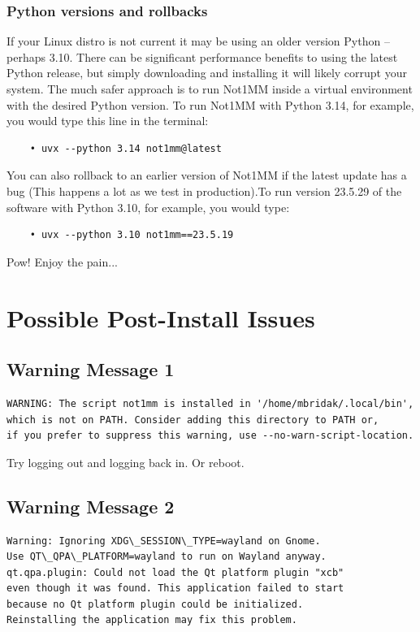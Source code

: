 \documentclass{article}
\begin{document}
\subsubsection{Python versions and rollbacks}
\label{subsec:rollback}
If your Linux distro is not current it may be using an older version Python -- perhaps 3.10. There can be significant performance benefits to using the latest Python release, but simply downloading and installing it will likely corrupt your system. The much safer approach is to run Not1MM inside a virtual environment with the desired Python version. To run Not1MM with Python 3.14, for example, you would type this line in the terminal:

\begin{verbatim}
    • uvx --python 3.14 not1mm@latest
\end{verbatim}

\noindent You can also rollback to an earlier version of Not1MM if the latest update has a bug (This happens a lot as we test in production).To run version 23.5.29 of the software with Python 3.10, for example, you would type:

\begin{verbatim}
    • uvx --python 3.10 not1mm==23.5.19
\end{verbatim}

Pow! Enjoy the pain... 

\section{Possible Post-Install Issues }

\subsection{Warning Message 1}

\begin{verbatim}
WARNING: The script not1mm is installed in '/home/mbridak/.local/bin',
which is not on PATH. Consider adding this directory to PATH or,
if you prefer to suppress this warning, use --no-warn-script-location.
\end{verbatim}

\noindent Try logging out and logging back in. Or reboot.

\subsection{Warning Message 2}

\begin{verbatim}
Warning: Ignoring XDG\_SESSION\_TYPE=wayland on Gnome.
Use QT\_QPA\_PLATFORM=wayland to run on Wayland anyway.
qt.qpa.plugin: Could not load the Qt platform plugin "xcb"
even though it was found. This application failed to start
because no Qt platform plugin could be initialized.
Reinstalling the application may fix this problem.
\end{verbatim}
\end{document}
